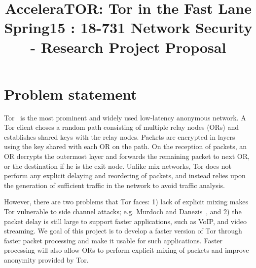 \documentclass[conference]{IEEEtran}
\begin{document}
\title{AcceleraTOR: Tor in the Fast Lane\\ 
  {\Large Spring15 : 18-731 Network Security - Research Project Proposal}
}

\author{
\and
{}
\and
{}
\and
{}
}

\maketitle

%

%
\section{Problem statement}
Tor~\cite{Dingledine:2004:TSO:1251375.1251396} is the most prominent and widely used low-latency anonymous network. A Tor client choses a  random path consisting of multiple relay nodes (ORs) and  establishes shared keys with the relay nodes. Packets are encrypted in layers using the key shared with each OR on the path. On the reception of packets,  an OR decrypts the outermost layer  and forwards the remaining packet to next OR, or the destination if he is the exit node. Unlike mix networks, Tor does not perform any explicit delaying and reordering of packets, and instead relies upon the  generation of sufficient traffic in the network to avoid traffic analysis. 

However, there are two problems that Tor faces: 1) lack of explicit mixing makes Tor vulnerable to side channel attacks; e.g. Murdoch and Danezis~\cite{Murdoch:2005:LTA:1058433.1059390}, and 2) the packet delay is still large to support faster applications, such as VoIP, and video streaming. We goal of this project is  to develop a faster version of Tor through faster packet processing and make it usable for such applications. Faster processing will also allow ORs to perform explicit mixing of packets and improve anonymity provided by Tor.

%
\end{document}
